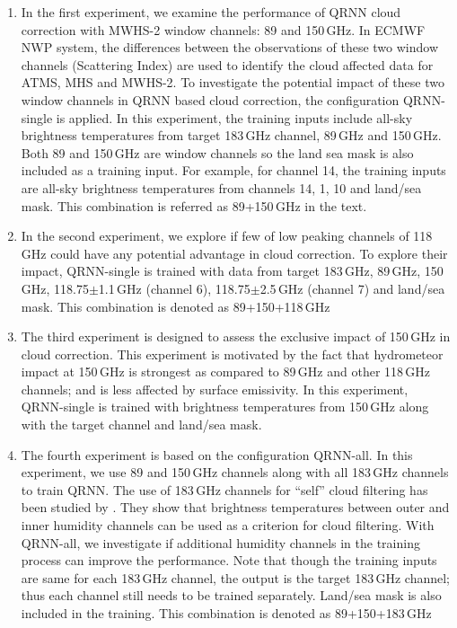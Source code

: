 \documentclass[amt, manuscript]{copernicus}
\begin{document}
\begin{enumerate}
	
	\item In the first experiment, we examine the performance of QRNN cloud correction with MWHS-2 window channels: 89 and 150\,GHz. In ECMWF NWP system, the differences between the observations of these two window channels (Scattering Index) \citep{Lu2015FY3C} are used to identify the cloud affected data for ATMS, MHS and MWHS-2. To investigate the potential impact of these two window channels in QRNN based cloud correction, the configuration QRNN-single is applied. In this experiment, the training inputs include all-sky brightness temperatures from target 183\,GHz channel, 89\,GHz and 150\,GHz. Both 89 and 150\,GHz are window channels so the land sea mask is also included as a training input. For example, for channel 14, the training inputs are all-sky brightness temperatures from channels 14, 1, 10 and land/sea mask. This combination is referred as 89+150\,GHz in the text.
	
	\item In the second experiment, we explore if few of low peaking channels of 118\,GHz could have any potential advantage in cloud correction. To explore their impact, QRNN-single is trained with data from target 183\,GHz, 89\,GHz, 150\,GHz, 118.75$\pm$1.1\,GHz (channel 6), 118.75$\pm$2.5\,GHz (channel 7) and land/sea mask. This combination is denoted as 89+150+118\,GHz
	
	\item The third experiment is designed to assess the exclusive impact of 150\,GHz in cloud correction. This experiment is motivated by the fact that hydrometeor impact at 150\,GHz is strongest as compared to 89\,GHz and other 118\,GHz channels; and is less affected by surface emissivity. In this experiment, QRNN-single is trained with brightness temperatures from 150\,GHz along with the target channel and land/sea mask. 
	
	\item The fourth experiment is based on the configuration QRNN-all. In this experiment, we use 89 and 150\,GHz channels along with all 183\,GHz channels to train QRNN. The use of 183\,GHz channels for ``self'' cloud filtering has been studied by  \citet{buehler:aclou:07}. They show that brightness temperatures between outer and inner humidity channels can be used as a criterion for cloud filtering. With QRNN-all, we investigate if additional humidity channels in the training process can improve the performance. Note that though the training inputs are same for each 183\,GHz channel, the output is the target 183\,GHz channel; thus each channel still needs to be trained separately. Land/sea mask is also included in the training. This combination is denoted as 89+150+183\,GHz
\end{enumerate}
\end{document}
